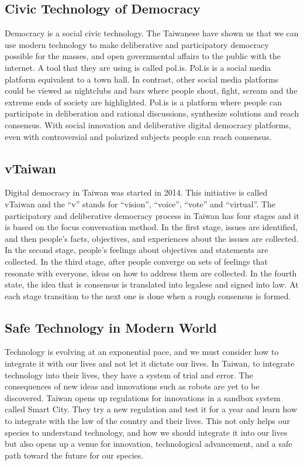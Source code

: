 \documentclass{IEEEtran}
\begin{document}
\subsection{Civic Technology of Democracy}
Democracy is a social civic technology. The Taiwanese have shown us that we can use modern technology to make deliberative and participatory democracy possible for the masses, and open governmental affairs to the public with the internet. A tool that they are using is called pol.is. Pol.is is a social media platform equivalent to a town hall. In contrast, other social media platforms could be viewed as nightclubs and bars where people shout, fight, scream and the extreme ends of society are highlighted. Pol.is is a platform where people can participate in deliberation and rational discussions, synthesize solutions and reach consensus.
With social innovation and deliberative digital democracy platforms, even with controversial and polarized subjects people can reach consensus.

\subsection{vTaiwan}
Digital democracy in Taiwan was started in 2014. This initiative is called vTaiwan and the “v” stands for “vision”, “voice”, “vote” and “virtual”. The participatory and deliberative democracy process in Taiwan has four stages and it is based on the focus conversation method. In the first stage, issues are identified, and then people’s facts, objectives, and experiences about the issues are collected. In the second stage, people's feelings about objectives and statements are collected. In the third stage, after people converge on sets of feelings that resonate with everyone, ideas on how to address them are collected. In the fourth state, the idea that is consensus is translated into legalese and signed into law. At each stage transition to the next one is done when a rough consensus is formed.

\subsection{Safe Technology in Modern World}
Technology is evolving at an exponential pace, and we must consider how to integrate it with our lives and not let it dictate our lives. In Taiwan, to integrate technology into their lives, they have a system of trial and error. The consequences of new ideas and innovations such as robots are yet to be discovered. Taiwan opens up regulations for innovations in a sandbox system called Smart City. They try a new regulation and test it for a year and learn how to integrate with the law of the country and their lives. This not only helps our species to understand technology, and how we should integrate it into our lives but also opens up a venue for innovation, technological advancement, and a safe path toward the future for our species.
\end{document}
